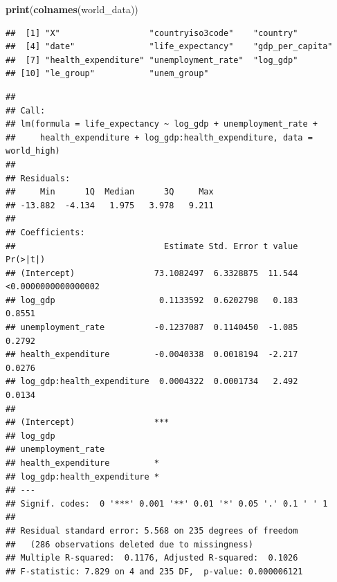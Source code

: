 \documentclass[
]{article}
\newenvironment{Shaded}{\begin{snugshade}}{\end{snugshade}}
\newcommand{\AttributeTok}[1]{\textcolor[rgb]{0.13,0.29,0.53}{#1}}
\newcommand{\CommentTok}[1]{\textcolor[rgb]{0.56,0.35,0.01}{\textit{#1}}}
\newcommand{\ConstantTok}[1]{\textcolor[rgb]{0.56,0.35,0.01}{#1}}
\newcommand{\FunctionTok}[1]{\textcolor[rgb]{0.13,0.29,0.53}{\textbf{#1}}}
\newcommand{\NormalTok}[1]{#1}
\newcommand{\OtherTok}[1]{\textcolor[rgb]{0.56,0.35,0.01}{#1}}
\newcommand{\SpecialCharTok}[1]{\textcolor[rgb]{0.81,0.36,0.00}{\textbf{#1}}}
\begin{document}
\begin{Shaded}
\begin{Highlighting}[]
\FunctionTok{print}\NormalTok{(}\FunctionTok{colnames}\NormalTok{(world\_data))}
\end{Highlighting}
\end{Shaded}

\begin{verbatim}
##  [1] "X"                  "countryiso3code"    "country"           
##  [4] "date"               "life_expectancy"    "gdp_per_capita"    
##  [7] "health_expenditure" "unemployment_rate"  "log_gdp"           
## [10] "le_group"           "unem_group"
\end{verbatim}

\begin{Shaded}
\end{Shaded}

\begin{verbatim}
## 
## Call:
## lm(formula = life_expectancy ~ log_gdp + unemployment_rate + 
##     health_expenditure + log_gdp:health_expenditure, data = world_high)
## 
## Residuals:
##     Min      1Q  Median      3Q     Max 
## -13.882  -4.134   1.975   3.978   9.211 
## 
## Coefficients:
##                              Estimate Std. Error t value            Pr(>|t|)
## (Intercept)                73.1082497  6.3328875  11.544 <0.0000000000000002
## log_gdp                     0.1133592  0.6202798   0.183              0.8551
## unemployment_rate          -0.1237087  0.1140450  -1.085              0.2792
## health_expenditure         -0.0040338  0.0018194  -2.217              0.0276
## log_gdp:health_expenditure  0.0004322  0.0001734   2.492              0.0134
##                               
## (Intercept)                ***
## log_gdp                       
## unemployment_rate             
## health_expenditure         *  
## log_gdp:health_expenditure *  
## ---
## Signif. codes:  0 '***' 0.001 '**' 0.01 '*' 0.05 '.' 0.1 ' ' 1
## 
## Residual standard error: 5.568 on 235 degrees of freedom
##   (286 observations deleted due to missingness)
## Multiple R-squared:  0.1176, Adjusted R-squared:  0.1026 
## F-statistic: 7.829 on 4 and 235 DF,  p-value: 0.000006121
\end{verbatim}
\end{document}
